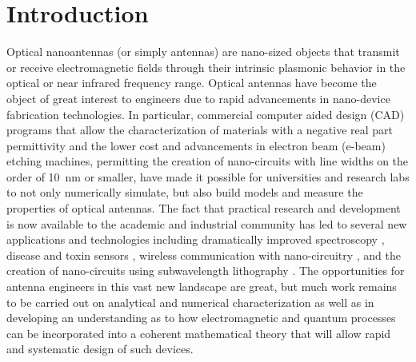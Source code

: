 \section{Introduction}
%
Optical nanoantennas (or simply antennas) are nano-sized objects that transmit or receive electromagnetic fields through their intrinsic plasmonic behavior in the optical or near infrared frequency range. Optical antennas have become the object of great interest to engineers due to rapid advancements in nano-device fabrication technologies. In particular, commercial computer aided design (CAD) programs that allow the characterization of materials with a negative real part permittivity and the lower cost and advancements in electron beam (e-beam) etching machines, permitting the creation of nano-circuits with line widths on the order of \SI{10}{\nm} or smaller, have made it possible for universities and research labs to not only numerically simulate, but also build models and measure the properties of optical antennas. The fact that practical research and development is now available to the academic and industrial community has led to several new applications and technologies including dramatically improved spectroscopy
\cite{Ouyang1992,Nie1997, Kneipp1997}, disease and toxin sensors \cite{Arduini2010, Nevels2012}, wireless communication with nano-circuitry \cite{Adato2011}, and the creation of nano-circuits using subwavelength lithography \cite{Torres2003, Ishihara2006}. The opportunities for antenna engineers in this vast new landscape are great, but much work remains to be carried out on analytical and numerical characterization as well as in developing an understanding as to how electromagnetic and quantum processes can be incorporated into a coherent mathematical theory that will allow rapid and systematic design of such devices.

